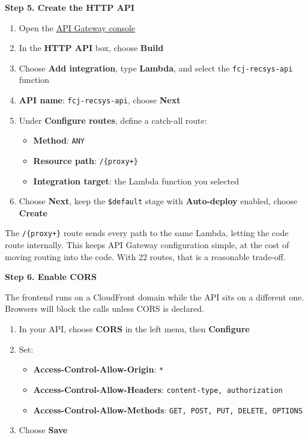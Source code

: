 \vspace{0.5em}\noindent\textbf{Step 5. Create the HTTP
API}\par

\begin{enumerate}
\def\labelenumi{\arabic{enumi}.}
\tightlist
\item
  Open the
  \href{https://ap-southeast-1.console.aws.amazon.com/apigateway/main/apis?region=ap-southeast-1}{API
  Gateway console}
\item
  In the \textbf{HTTP API} box, choose \textbf{Build}
\item
  Choose \textbf{Add integration}, type \textbf{Lambda}, and select the
  \texttt{fcj-recsys-api} function
\item
  \textbf{API name}: \texttt{fcj-recsys-api}, choose \textbf{Next}
\item
  Under \textbf{Configure routes}, define a catch-all route:

  \begin{itemize}
  \tightlist
  \item
    \textbf{Method}: \texttt{ANY}
  \item
    \textbf{Resource path}: \texttt{/\{proxy+\}}
  \item
    \textbf{Integration target}: the Lambda function you selected
  \end{itemize}
\item
  Choose \textbf{Next}, keep the \texttt{\$default} stage with
  \textbf{Auto-deploy} enabled, choose \textbf{Create}
\end{enumerate}

The \texttt{/\{proxy+\}} route sends every path to the same Lambda,
letting the code route internally. This keeps API Gateway configuration
simple, at the cost of moving routing into the code. With 22 routes,
that is a reasonable trade-off.

\vspace{0.5em}\noindent\textbf{Step 6. Enable CORS}\par

The frontend runs on a CloudFront domain while the API sits on a
different one. Browsers will block the calls unless CORS is declared.

\begin{enumerate}
\def\labelenumi{\arabic{enumi}.}
\tightlist
\item
  In your API, choose \textbf{CORS} in the left menu, then
  \textbf{Configure}
\item
  Set:

  \begin{itemize}
  \tightlist
  \item
    \textbf{Access-Control-Allow-Origin}: \texttt{*}
  \item
    \textbf{Access-Control-Allow-Headers}:
    \texttt{content-type,\ authorization}
  \item
    \textbf{Access-Control-Allow-Methods}:
    \texttt{GET,\ POST,\ PUT,\ DELETE,\ OPTIONS}
  \end{itemize}
\item
  Choose \textbf{Save}
\end{enumerate}

